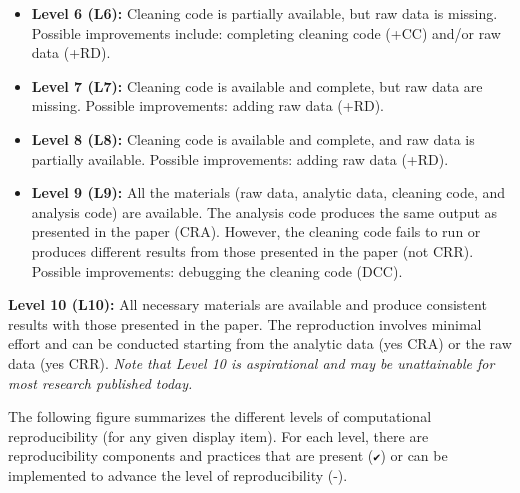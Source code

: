 \documentclass[
]{book}
\begin{document}
\begin{itemize}
\item
  \textbf{Level 6 (L6):} Cleaning code is partially available, but raw data is missing. Possible improvements include: completing cleaning code (+CC) and/or raw data (+RD).
\item
  \textbf{Level 7 (L7):} Cleaning code is available and complete, but raw data are missing. Possible improvements: adding raw data (+RD).
\item
  \textbf{Level 8 (L8):} Cleaning code is available and complete, and raw data is partially available. Possible improvements: adding raw data (+RD).
\item
  \textbf{Level 9 (L9):} All the materials (raw data, analytic data, cleaning code, and analysis code) are available. The analysis code produces the same output as presented in the paper (CRA). However, the cleaning code fails to run or produces different results from those presented in the paper (not CRR). Possible improvements: debugging the cleaning code (DCC).
\end{itemize}

\textbf{Level 10 (L10):} All necessary materials are available and produce consistent results with those presented in the paper. The reproduction involves minimal effort and can be conducted starting from the analytic data (yes CRA) or the raw data (yes CRR). \emph{Note that Level 10 is aspirational and may be unattainable for most research published today.}

The following figure summarizes the different levels of computational reproducibility (for any given display item). For each level, there are reproducibility components and practices that are present (\texttt{✔}) or can be implemented to advance the level of reproducibility (-).
\end{document}
